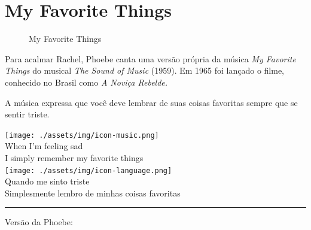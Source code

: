 \hypertarget{my-favorite-things}{%
\section{My Favorite Things}\label{my-favorite-things}}

\begin{figure}
  \centering
    \caption{My Favorite Things\label{fig:my-favorite-things}}
\end{figure}

Para acalmar Rachel, Phoebe canta uma versão própria da música \emph{My
Favorite Things} do musical \emph{The Sound of Music} (1959). Em 1965
foi lançado o filme, conhecido no Brasil como \emph{A Noviça Rebelde.}

A música expressa que você deve lembrar de suas coisas favoritas sempre
que se sentir triste.

\bigskip
\begin{tcolorbox}[enhanced,
    drop fuzzy shadow southeast, boxrule=0.3pt,
    lower separated=false, sidebyside, sidebyside align=top,
    halign=flush right, halign lower=left,
    colframe=black!30!dialogoBorder,colback=musicaBg]
\texttt{[image: ./assets/img/icon-music.png]}\\
When I’m feeling sad\\I simply remember my favorite things\\
\tcblower
\texttt{[image: ./assets/img/icon-language.png]}\\
Quando me sinto triste\\Simplesmente lembro de minhas coisas favoritas\\
\end{tcolorbox}

\begin{center}\rule{0.5\linewidth}{0.5pt}\end{center}

Versão da Phoebe:

